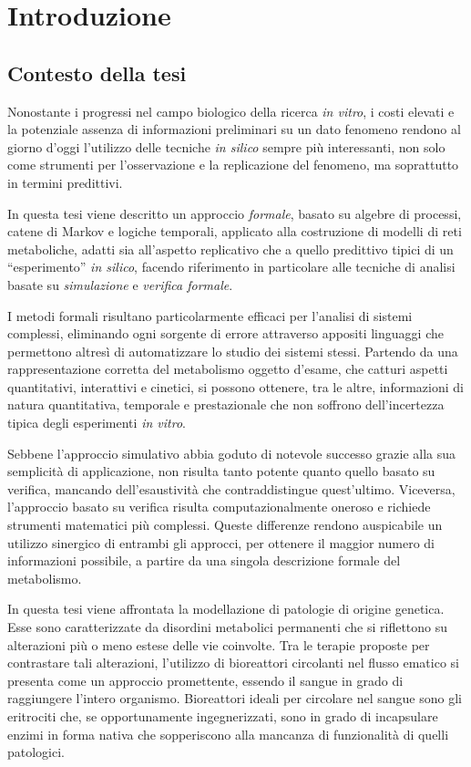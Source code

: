 \chapter{Introduzione}\label{cap:introduzione}
	\section{Contesto della tesi}
		Nonostante i progressi nel campo biologico della ricerca \emph{in vitro}, i costi elevati e la potenziale assenza di informazioni preliminari su un dato fenomeno rendono al giorno d'oggi l'utilizzo delle tecniche \emph{in silico} sempre pi\`u interessanti, non solo come strumenti per l'osservazione e la replicazione del fenomeno, ma soprattutto in termini predittivi.
		
		In questa tesi viene descritto un approccio \emph{formale}, basato su algebre di processi, catene di Markov e logiche temporali, applicato alla costruzione di modelli di reti metaboliche, adatti sia all'aspetto replicativo che a quello predittivo tipici di un ``esperimento'' \emph{in silico}, facendo riferimento in particolare alle tecniche di analisi basate su \emph{simulazione} e \emph{verifica formale}.
		
		I metodi formali risultano particolarmente efficaci per l'analisi di sistemi complessi, eliminando ogni sorgente di errore attraverso appositi linguaggi che permettono altres\`i di automatizzare lo studio dei sistemi stessi.
		Partendo da una rappresentazione corretta del metabolismo oggetto d'esame, che catturi aspetti quantitativi, interattivi e cinetici, si possono ottenere, tra le altre, informazioni di natura quantitativa, temporale e prestazionale che non soffrono dell'incertezza tipica degli esperimenti \emph{in vitro}.
		
		Sebbene l'approccio simulativo abbia goduto di notevole successo grazie alla sua semplicit\`a di applicazione, non risulta tanto potente quanto quello basato su verifica, mancando dell'esaustivit\`a che contraddistingue quest'ultimo.
		Viceversa, l'approccio basato su verifica risulta computazionalmente oneroso e richiede strumenti matematici pi\`u complessi.
		Queste differenze rendono auspicabile un utilizzo sinergico di entrambi gli approcci, per ottenere il maggior numero di informazioni possibile, a partire da una singola descrizione formale del metabolismo.
		
		In questa tesi viene affrontata la modellazione di patologie di origine genetica.
		Esse sono caratterizzate da disordini metabolici permanenti che si riflettono su alterazioni pi\`u o meno estese delle vie coinvolte.
		Tra le terapie proposte per contrastare tali alterazioni, l'utilizzo di bioreattori circolanti nel flusso ematico si presenta come un approccio promettente, essendo il sangue in grado di raggiungere l'intero organismo.
		Bioreattori ideali per circolare nel sangue sono gli eritrociti che, se opportunamente ingegnerizzati, sono in grado di incapsulare enzimi in forma nativa che sopperiscono alla mancanza di funzionalit\`a di quelli patologici.

